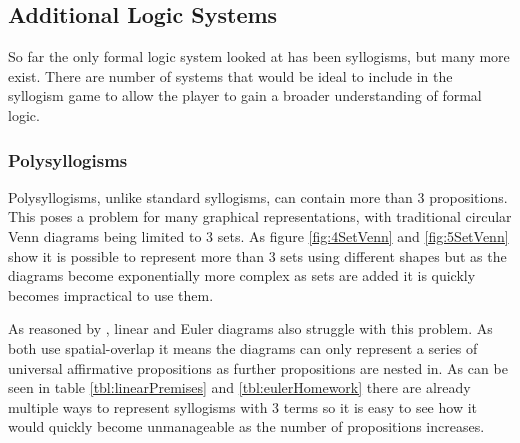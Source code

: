 \documentclass[12pt,a4paper]{report}
\begin{document}
\subsection{Additional Logic Systems}
So far the only formal logic system looked at has been syllogisms, but many more exist. There are number of systems that would be ideal to include in the syllogism game to allow the player to gain a broader understanding of formal logic.

\subsubsection{Polysyllogisms}
Polysyllogisms, unlike standard syllogisms, can contain more than 3 propositions. This poses a problem for many graphical representations, with traditional circular Venn diagrams being limited to 3 sets. As figure \ref{fig:4SetVenn} and \ref{fig:5SetVenn} show it is possible to represent more than 3 sets using different shapes but as the diagrams become exponentially more complex as sets are added it is quickly becomes impractical to use them.

As reasoned by \cite{cheng2014graphical}, linear and Euler diagrams also struggle with this problem. As both use spatial-overlap it means the diagrams can only represent a series of universal affirmative propositions as further propositions are nested in. As can be seen in table \ref{tbl:linearPremises} and \ref{tbl:eulerHomework} there are already multiple ways to represent syllogisms with 3 terms so it is easy to see how it would quickly become unmanageable as the number of propositions increases.
\end{document}
